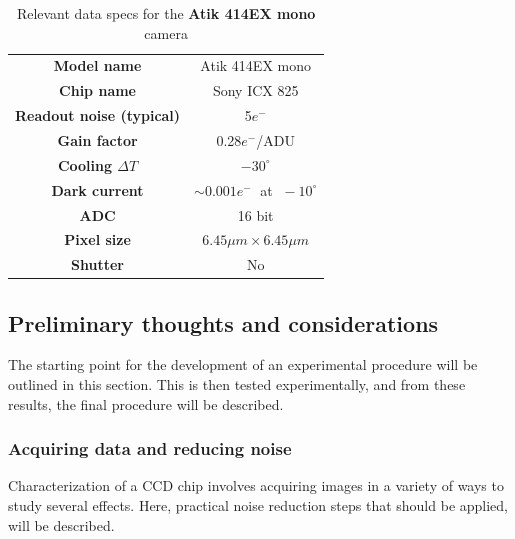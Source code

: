 \documentclass[../main.tex]{subfiles}
\begin{document}
		\begin{table}[]
			\centering
			\begin{tabular}{|c|c|}
				\hline
				\textbf{Model name }& Atik 414EX mono \\
				\textbf{Chip name}& Sony ICX 825\\
				\textbf{Readout noise (typical)}& 5$e^-$\\
				\textbf{Gain factor}& 0.28$e^-$/ADU\\
				\textbf{Cooling $\Delta T$}& $-30^\circ$\\
				\textbf{Dark current}& $\sim 0.001 e^-\;$ at $\;-10^\circ$ \\
				\textbf{ADC}& 16 bit\\
				\textbf{Pixel size}& $6.45 \mu m \times 6.45 \mu m$\\ 
				\textbf{Shutter}&No\\
				\hline
			\end{tabular}
		\caption{Relevant data specs for the \textbf{Atik 414EX mono} camera \cite{atik414specs}}\label{table:testcam}
		\end{table}
			
		\subsection{Preliminary thoughts and considerations}
		The starting point for the development of an experimental procedure will be outlined in this section. This is then tested experimentally, and from these results, the final procedure will be described. 
		
		\subsubsection{Acquiring data and reducing noise}
		Characterization of a CCD chip involves acquiring images in a variety of ways to study several effects. Here, practical noise reduction steps that should be applied, will be described. 
		
\end{document}
